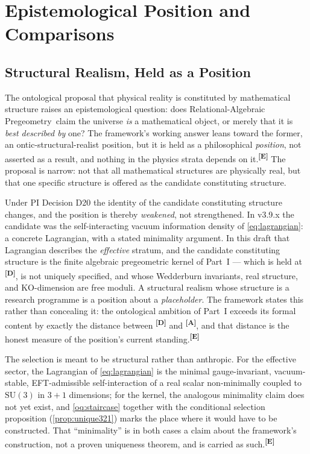 \documentclass[12pt,a4paper,twoside]{article}
\theoremstyle{plain}
\theoremstyle{definition}
\theoremstyle{remark}
\newcommand{\ProjectShort}{Relational-Algebraic Pregeometry}
\newcommand{\RAP}{\ProjectShort}
\newcommand{\catmark}[1]{\textsuperscript{\textsf{\textbf{[#1]}}}}
\begin{document}
\section{Epistemological Position and Comparisons}
\label{sec:epistemology}

\subsection{Structural Realism, Held as a Position}
\label{subsec:structural-realism}

The ontological proposal that physical reality is constituted by
mathematical structure raises an epistemological question: does \RAP\
claim the universe \emph{is} a mathematical object, or merely that it is
\emph{best described by} one? The framework's working answer leans toward
the former, an ontic-structural-realist position, but it is held as a
philosophical \emph{position}, not asserted as a result, and nothing in
the physics strata depends on it.\catmark{E} The proposal is narrow: not
that all mathematical structures are physically real, but that one
specific structure is offered as the candidate constituting structure.

\begin{governancebox}[What D20 Does to the Structural-Realist Position]
Under PI Decision D20 the identity of the candidate constituting
structure changes, and the position is thereby \emph{weakened}, not
strengthened. In v3.9.x the candidate was the self-interacting vacuum
information density of \cref{eq:lagrangian}: a concrete Lagrangian, with
a stated minimality argument. In this draft that Lagrangian describes the
\emph{effective} stratum, and the candidate constituting structure is the
finite algebraic pregeometric kernel of Part~I --- which is held at
\catmark{D}, is not uniquely specified, and whose Wedderburn invariants,
real structure, and KO-dimension are free moduli. A structural realism
whose structure is a research programme is a position about a
\emph{placeholder}. The framework states this rather than concealing it:
the ontological ambition of Part~I exceeds its formal content by exactly
the distance between \catmark{D} and \catmark{A}, and that distance is
the honest measure of the position's current standing.\catmark{E}
\end{governancebox}

\noindent The selection is meant to be structural rather than anthropic.
For the effective sector, the Lagrangian of \cref{eq:lagrangian} is the
minimal gauge-invariant, vacuum-stable, EFT-admissible self-interaction
of a real scalar non-minimally coupled to $\mathrm{SU}(3)$ in $3+1$
dimensions; for the kernel, the analogous minimality claim does not yet
exist, and \cref{oq:staircase} together with the conditional selection
proposition (\cref{prop:unique321}) marks the place where it would have
to be constructed. That ``minimality'' is in both cases a claim about the
framework's construction, not a proven uniqueness theorem, and is carried
as such.\catmark{E}
\end{document}

